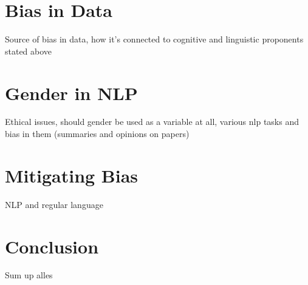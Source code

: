 \documentclass{article}
\begin{document}
\section{Bias in Data}
Source of bias in data, how it's connected to cognitive and linguistic proponents stated above

\section{Gender in NLP}
Ethical issues, should gender be used as a variable at all, various nlp tasks and bias in them (summaries and opinions on papers)

\section{Mitigating Bias}
NLP and regular language

\section{Conclusion}
Sum up alles

\clearpage


\end{document}
